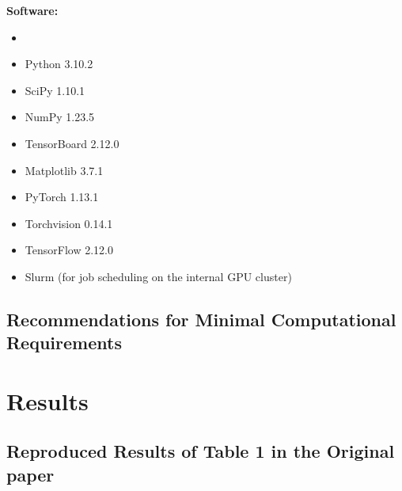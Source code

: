 \textbf{Software:}
\begin{itemize}
    \item {}
    \item Python 3.10.2
    \item SciPy 1.10.1
    \item NumPy 1.23.5
    \item TensorBoard 2.12.0
    \item Matplotlib 3.7.1
    \item PyTorch 1.13.1
    \item Torchvision 0.14.1
    \item TensorFlow 2.12.0
    \item Slurm (for job scheduling on the internal GPU cluster)
\end{itemize}


\subsection{Recommendations for Minimal Computational Requirements}
\label{sec:Recommendations-for-Minimal-Computational-Requirements}

\section{Results}



\subsection{Reproduced Results of Table 1 in the Original paper}

